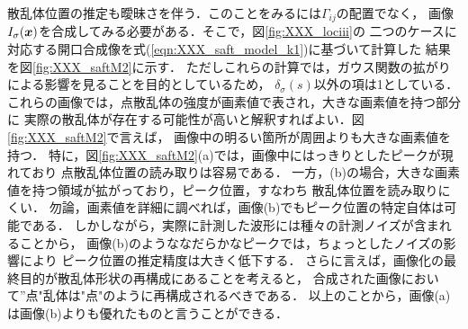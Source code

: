 散乱体位置の推定も曖昧さを伴う．このことをみるには$\Gamma_{ij}$の配置でなく，
画像$I_\sigma(\mbox{\boldmath $x$})$を合成してみる必要がある．そこで，図\ref{fig:XXX_lociii}の
二つのケースに対応する開口合成像を式(\ref{eqn:XXX_saft_model_k1})に基づいて計算した
結果を図\ref{fig:XXX_saftM2}に示す．
ただしこれらの計算では，ガウス関数の拡がりによる影響を見ることを目的としているため，
$\delta_\sigma(s)$以外の項は1としている．
これらの画像では，点散乱体の強度が画素値で表され，大きな画素値を持つ部分に
実際の散乱体が存在する可能性が高いと解釈すればよい．図\ref{fig:XXX_saftM2}で言えば，
画像中の明るい箇所が周囲よりも大きな画素値を持つ．
特に，図\ref{fig:XXX_saftM2}(a)では，画像中にはっきりとしたピークが現れており
点散乱体位置の読み取りは容易である．
一方，(b)の場合，大きな画素値を持つ領域が拡がっており，ピーク位置，すなわち
散乱体位置を読み取りにくい．
勿論，画素値を詳細に調べれば，画像(b)でもピーク位置の特定自体は可能である．
しかしながら，実際に計測した波形には種々の計測ノイズが含まれることから，
画像(b)のようななだらかなピークでは，ちょっとしたノイズの影響により
ピーク位置の推定精度は大きく低下する．
さらに言えば，画像化の最終目的が散乱体形状の再構成にあることを考えると，
合成された画像において”点"乱体は"点"のように再構成されるべきである．
以上のことから，画像(a)は画像(b)よりも優れたものと言うことができる．

